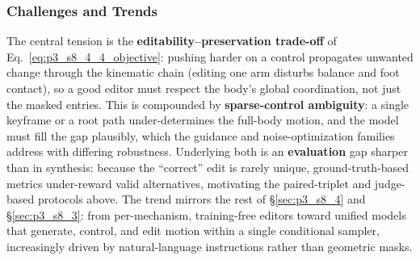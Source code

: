 \subsubsection{Challenges and Trends}
\label{subsubsec:p3_s8_4_4_challenges}
The central tension is the \textbf{editability--preservation trade-off} of Eq.~\eqref{eq:p3_s8_4_4_objective}: pushing harder on a control propagates unwanted change through the kinematic chain (editing one arm disturbs balance and foot contact), so a good editor must respect the body's global coordination, not just the masked entries.
This is compounded by \textbf{sparse-control ambiguity}: a single keyframe or a root path under-determines the full-body motion, and the model must fill the gap plausibly, which the guidance and noise-optimization families address with differing robustness.
Underlying both is an \textbf{evaluation} gap sharper than in synthesis: because the ``correct'' edit is rarely unique, ground-truth-based metrics under-reward valid alternatives, motivating the paired-triplet and judge-based protocols above.
The trend mirrors the rest of §\ref{sec:p3_s8_4} and §\ref{sec:p3_s8_3}: from per-mechanism, training-free editors toward unified models that generate, control, and edit motion within a single conditional sampler, increasingly driven by natural-language instructions rather than geometric masks.









